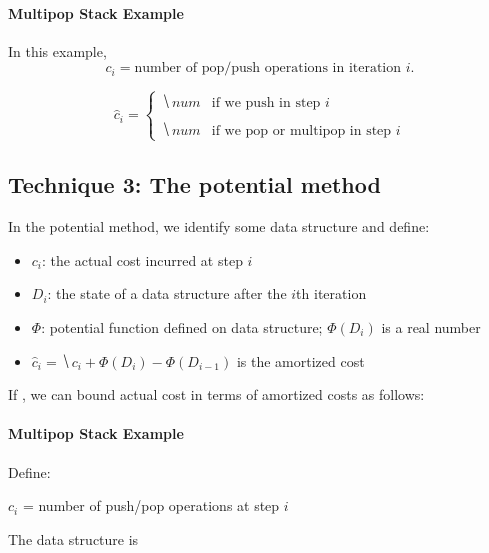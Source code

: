 \documentclass[11  pt]{article}
\begin{document}

\paragraph{Multipop Stack Example}
In this example, 
$$c_i = \text{number of pop/push operations in iteration $i$}.$$

\begin{equation*}
	\hat{c}_i = \begin{cases}
		\hide{num} & \text{if we push in step $i$} \\ \\
		\hide{num} & \text{if we pop or multipop in step $i$}
	\end{cases}
\end{equation*}

\pagebreak


\subsection{Technique 3: The potential method}
In the potential method, we identify some data structure and define:
\begin{itemize}
	\item $c_i$: the actual cost incurred at step $i$ 
	\item $D_i$: the state of a  data structure after the $i$th iteration
	\item $\Phi$: potential function defined on data structure; $\Phi(D_i)$ is a real number
	\item $\hat{c}_i = \hide{c_i + \Phi(D_i) - \Phi(D_{i-1})}$ is the amortized cost
\end{itemize}
If , we can bound actual cost in terms of amortized costs as follows:


\vfill


\pagebreak
\paragraph{Multipop Stack Example} 
Define:


$c_i$ = number of push/pop operations at step $i$

The data structure is   \\%
\end{document}
